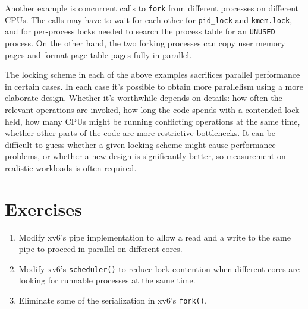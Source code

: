 Another example is concurrent calls to {\tt fork} from different
processes on different CPUs. The calls may have to wait for each other
for {\tt pid\_lock} and {\tt kmem.lock}, and for per-process locks
needed to search the process table for an {\tt UNUSED} process. On the
other hand, the two forking processes can copy user memory pages and
format page-table pages fully in parallel.

The locking scheme in each of the above examples sacrifices parallel
performance in certain cases. In each case it's possible to obtain
more parallelism using a more elaborate design. Whether it's
worthwhile depends on details: how often the relevant operations are
invoked, how long the code spends with a contended lock held, how many
CPUs might be running conflicting operations at the same time, whether
other parts of the code are more restrictive bottlenecks. It can be
difficult to guess whether a given locking scheme might cause
performance problems, or whether a new design is significantly better,
so measurement on realistic workloads is often required.

\section{Exercises}

\begin{enumerate}

\item Modify xv6's pipe implementation to allow a read and
  a write to the same pipe to proceed in parallel on different cores.

\item Modify xv6's \texttt{scheduler()} to reduce lock contention
  when different cores are looking for runnable processes at the same time.

\item Eliminate some of the serialization in xv6's \texttt{fork()}.

\end{enumerate}

